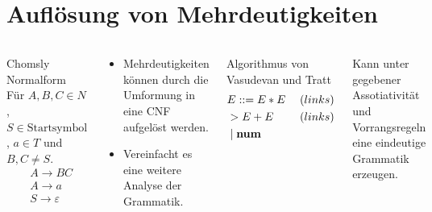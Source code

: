 \documentclass[t]{beamer}
\renewcommand{\Coloneqq}{\mathrel{\mathop{::}}=}
\begin{document}
	\section{Auflösung von Mehrdeutigkeiten}\label{sec:auflsung-von-mehrdeutigkeiten}
	\begin{frame}
		\vspace{-1em}
		\begin{columns}[T]
			\begin{block}{Chomsly Normalform}
				Für $A,B,C \in N$, $S \in \text{Startsymbol}$, $a \in T$ und $B,C \neq S$. \\
				\begin{align*}
					& A \rightarrow BC \\
					& A \rightarrow a \\
					& S \rightarrow \varepsilon
				\end{align*}
			\end{block}
			\begin{exampleblock}{}
				\begin{itemize}
					\item Mehrdeutigkeiten können durch die Umformung in eine CNF aufgelöst werden.\cite{kemp1974}
					\item Vereinfacht es eine weitere Analyse der Grammatik.
				\end{itemize}
			\end{exampleblock}
			\begin{block}{Algorithmus von Vasudevan und Tratt}
				\begin{align*}
					& E \Coloneqq E * E \phantom{|} & (links) \\
					& > E + E & (links) \\
					& \phantom{|} | \phantom{|} \bold{num}
				\end{align*}
			\end{block}
			\begin{exampleblock}{}
				Kann unter gegebener Assotiativität und Vorrangsregeln eine eindeutige Grammatik erzeugen.
			\end{exampleblock}
		\end{columns}
	\end{frame}
\end{document}
